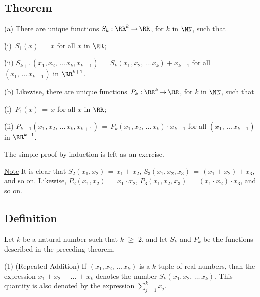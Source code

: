 {\V

            \subsection{\small{\bf Theorem}}
            \label{ThmB10.27}

\V

\hspace*{\parindent}(a) There are unique functions $S_{k}:{\RR}^{k} \,{\rightarrow}\, {\RR}$, for $k$ in ${\NN}$, such that

        \h (i)\, $S_{1}(x) \,=\, x$ for all $x$ in ${\RR}$;

        \h (ii) $S_{k+1}(x_{1},x_{2},\,{\ldots}\,x_{k},x_{k+1}) \,=\, S_{k}(x_{1},x_{2},\,{\ldots}\,x_{k})+x_{k+1}$ for all $(x_{1},\,{\ldots}\,x_{k+1})$ in ${\RR}^{k+1}$.

\V

        (b) Likewise, there are unique functions $P_{k}:{\RR}^{k} \,{\rightarrow}\, {\RR}$, for $k$ in ${\NN}$, such that

        \h (i)\, $P_{1}(x) \,=\, x$ for all $x$ in ${\RR}$;

        \h (ii) $P_{k+1}(x_{1},x_{2},\,{\ldots}\,x_{k},x_{k+1}) \,=\, P_{k}(x_{1},x_{2},\,{\ldots}\,x_{k}){\cdot}x_{k+1}$ for all $(x_{1},\,{\ldots}\,x_{k+1})$ in ${\RR}^{k+1}$.

\V

        The simple proof by induction is left as an exercise.

\V
\V

        \underline{Note} It is clear that $S_{2}(x_{1},x_{2}) \,=\, x_{1}+x_{2}$, $S_{3}(x_{1},x_{2},x_{3}) \,=\, (x_{1}+x_{2})+x_{3}$, and so on.
    Likewise, $P_{2}(x_{1},x_{2}) \,=\, x_{1}{\cdot}x_{2}$, $P_{3}(x_{1},x_{2},x_{3}) \,=\, (x_{1}{\cdot}x_{2}){\cdot}x_{3}$, and so on.

\V
\V

            \subsection{\small{\bf Definition}}
            \label{DefB10.30}

        Let $k$ be a natural number such that $k\,\,{\geq}\,\,2$, and let $S_{k}$ and $P_{k}$ be the functions described in the preceding theorem.

\V

        (1) (Repeated Addition) If $(x_{1},x_{2},\,{\ldots}\,x_{k})$ is a $k$-tuple of real numbers,
    than the expression $x_{1}+x_{2}+\,{\ldots}\,+x_{k}$ denotes the number $S_{k}(x_{1},x_{2},\,{\ldots}\,x_{k})$.
    This quantity is also denoted by the expression $\sum_{j=1}^{k} x_{j}$.

}
